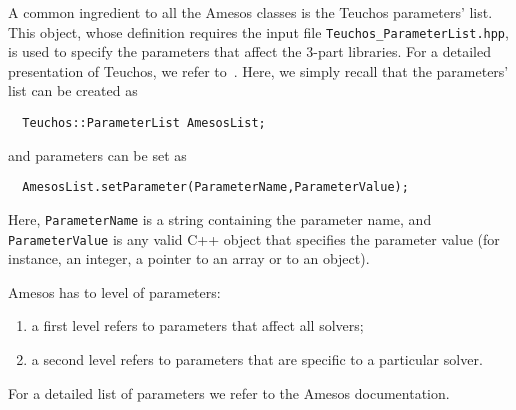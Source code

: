 A common ingredient to all the Amesos classes is the Teuchos parameters'
list. This object, whose definition requires the input file
\verb!Teuchos_ParameterList.hpp!, is used to specify the parameters that
affect the 3-part libraries. For a detailed presentation of Teuchos, we
refer to~\cite{Teuchos-home-page}. Here, we simply recall that the
parameters' list can be created as
\begin{verbatim}
  Teuchos::ParameterList AmesosList;
\end{verbatim}
and parameters can be set as
\begin{verbatim}
  AmesosList.setParameter(ParameterName,ParameterValue);
\end{verbatim}
Here, \verb!ParameterName! is a string containing the parameter name,
and \verb!ParameterValue! is any valid C++ object that specifies the
parameter value (for instance, an integer, a pointer to an array or to
an object).

Amesos has to level of parameters: 
\begin{enumerate}
\item a first level refers to parameters that affect all solvers;
\item a second level refers to parameters that are specific to a
  particular solver.
\end{enumerate}


For a detailed list of parameters we refer to the Amesos documentation.
